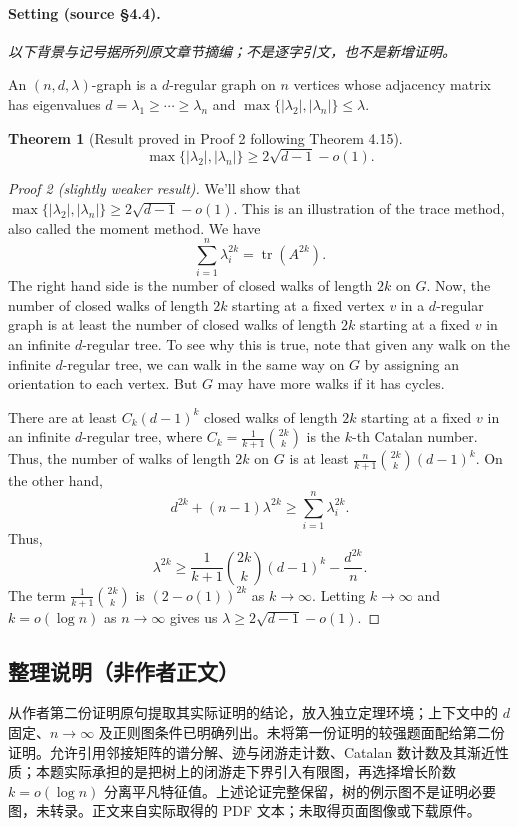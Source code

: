\documentclass[UTF8,11pt]{ctexart}
\newtheorem*{theorem}{Theorem}
\theoremstyle{definition}
\begin{document}
\paragraph{Setting (source \S4.4).}
\noindent\textit{以下背景与记号据所列原文章节摘编；不是逐字引文，也不是新增证明。}\par An $(n,d,\lambda)$-graph is a $d$-regular graph on $n$ vertices whose adjacency matrix has eigenvalues $d=\lambda_1\geq\cdots\geq\lambda_n$ and $\max\{|\lambda_2|,|\lambda_n|\}\leq\lambda$.
\begin{theorem}[Result proved in Proof 2 following Theorem 4.15]
\[\max\{|\lambda_2|,|\lambda_n|\}\geq2\sqrt{d-1}-o(1).\]
\end{theorem}
\begin{proof}[Proof 2 (slightly weaker result)]
We'll show that $\max\{|\lambda_2|,|\lambda_n|\}\geq2\sqrt{d-1}-o(1)$. This is an illustration of the trace method, also called the moment method. We have
\[\sum_{i=1}^n\lambda_i^{2k}=\operatorname{tr}(A^{2k}).\]
The right hand side is the number of closed walks of length $2k$ on $G$. Now, the number of closed walks of length $2k$ starting at a fixed vertex $v$ in a $d$-regular graph is at least the number of closed walks of length $2k$ starting at a fixed $v$ in an infinite $d$-regular tree. To see why this is true, note that given any walk on the infinite $d$-regular tree, we can walk in the same way on $G$ by assigning an orientation to each vertex. But $G$ may have more walks if it has cycles.

There are at least $C_k(d-1)^k$ closed walks of length $2k$ starting at a fixed $v$ in an infinite $d$-regular tree, where $C_k=\frac1{k+1}\binom{2k}{k}$ is the $k$-th Catalan number. Thus, the number of walks of length $2k$ on $G$ is at least $\frac{n}{k+1}\binom{2k}{k}(d-1)^k$. On the other hand,
\[d^{2k}+(n-1)\lambda^{2k}\geq\sum_{i=1}^n\lambda_i^{2k}.\]
Thus,
\[\lambda^{2k}\geq\frac1{k+1}\binom{2k}{k}(d-1)^k-\frac{d^{2k}}{n}.\]
The term $\frac1{k+1}\binom{2k}{k}$ is $(2-o(1))^{2k}$ as $k\to\infty$. Letting $k\to\infty$ and $k=o(\log n)$ as $n\to\infty$ gives us $\lambda\geq2\sqrt{d-1}-o(1)$.
\end{proof}
\subsection*{整理说明（非作者正文）}
从作者第二份证明原句提取其实际证明的结论，放入独立定理环境；上下文中的 $d$ 固定、$n\to\infty$ 及正则图条件已明确列出。未将第一份证明的较强题面配给第二份证明。允许引用邻接矩阵的谱分解、迹与闭游走计数、Catalan 数计数及其渐近性质；本题实际承担的是把树上的闭游走下界引入有限图，再选择增长阶数 $k=o(\log n)$ 分离平凡特征值。上述论证完整保留，树的例示图不是证明必要图，未转录。正文来自实际取得的 PDF 文本；未取得页面图像或下载原件。
\end{document}
